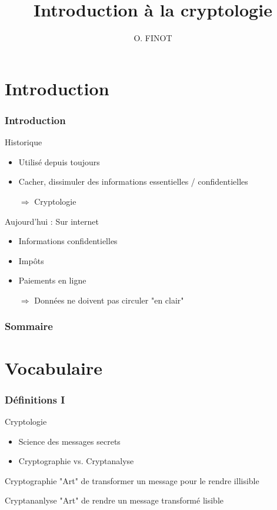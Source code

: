 \documentclass[xcolor={dvipsnames}]{beamer}
\title{Introduction à la cryptologie}
\author{O. FINOT}\institute{Lycée S$^t$ Vincent de Paul}
\begin{document}
\begin{frame}
  \titlepage 
\end{frame}

\section{Introduction}

\begin{frame}
\frametitle{Introduction}	
	
	\begin{block}{Historique}
		\begin{itemize}
			\item Utilisé depuis toujours
			\item Cacher, dissimuler des informations essentielles / confidentielles\pause
			\item[$\Rightarrow$] Cryptologie
		\end{itemize}	\pause
	\end{block}
	
	\begin{block}{Aujourd'hui : Sur internet}
		\begin{itemize}
			\item Informations confidentielles
			\item Impôts
			\item Paiements en ligne\pause
			\item[$\Rightarrow$] Données ne doivent pas circuler "en clair"
		\end{itemize}
	\end{block}
	
\end{frame}

\begin{frame}
	\frametitle{Sommaire}
	\tableofcontents[hideallsubsections]
\end{frame} 

\section{Vocabulaire}

\begin{frame}
\frametitle{Définitions I}


	\begin{alertblock}{Cryptologie}
		\begin{itemize}
			\item Science des messages secrets
			\item Cryptographie vs. Cryptanalyse
		\end{itemize}
	\end{alertblock}\pause
	
	\begin{block}{Cryptographie}
		"Art" de transformer un message pour le rendre illisible
	\end{block}\pause
	
	\begin{block}{Cryptananlyse}
		"Art" de rendre un message transformé lisible
	\end{block}
\end{frame}
\end{document}

